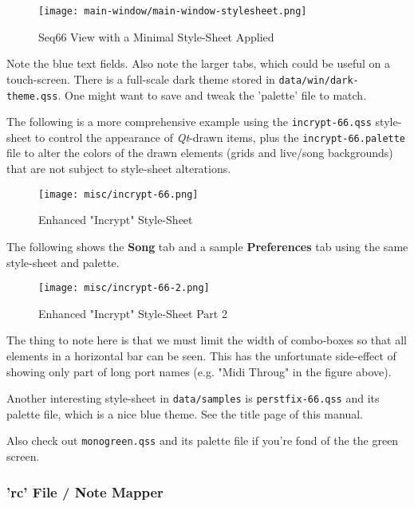 \begin{figure}[H]
   \centering 
   \texttt{[image: main-window/main-window-stylesheet.png]}
   \caption{Seq66 View with a Minimal Style-Sheet Applied}
   \label{fig:view_with_style_sheet_applied}
\end{figure}

   Note the blue text fields. Also note the larger tabs, which could be useful
   on a touch-screen.
   There is a full-scale dark theme stored in
   \texttt{data/win/dark-theme.qss}.
   One might want to save and tweak the 'palette' file to match.

   The following is a more comprehensive example using
   the \texttt{incrypt-66.qss} style-sheet to control
   the appearance of \textsl{Qt}-drawn items, plus
   the \texttt{incrypt-66.palette} file to alter the colors
   of the drawn elements (grids and live/song backgrounds)
   that are not subject to style-sheet alterations.

\begin{figure}[H]
   \centering 
   \texttt{[image: misc/incrypt-66.png]}
   \caption{Enhanced "Incrypt" Style-Sheet}
   \label{fig:view_with_enhanced_incrypt_style_sheet}
\end{figure}

   The following shows the \textbf{Song} tab and a sample
   \textbf{Preferences} tab using the same style-sheet and palette.

\begin{figure}[H]
   \centering 
   \texttt{[image: misc/incrypt-66-2.png]}
   \caption{Enhanced "Incrypt" Style-Sheet Part 2}
   \label{fig:view_with_enhanced_incrypt_style_sheet_2}
\end{figure}

   The thing to note here is that we must limit the width of combo-boxes so
   that all elements in a horizontal bar can be seen.
   This has the unfortunate side-effect of showing only part of long
   port names (e.g. "Midi Throug" in the figure above).

   Another interesting style-sheet in \texttt{data/samples} is
   \texttt{perstfix-66.qss} and its palette file, which is a nice blue theme.
   See the title page of this manual.

   Also check out \texttt{monogreen.qss} and its palette file if you're fond
   of the the green screen.

\subsubsection{'rc' File / Note Mapper}
\label{subsubsec:configuration_rc_note_mapper}

